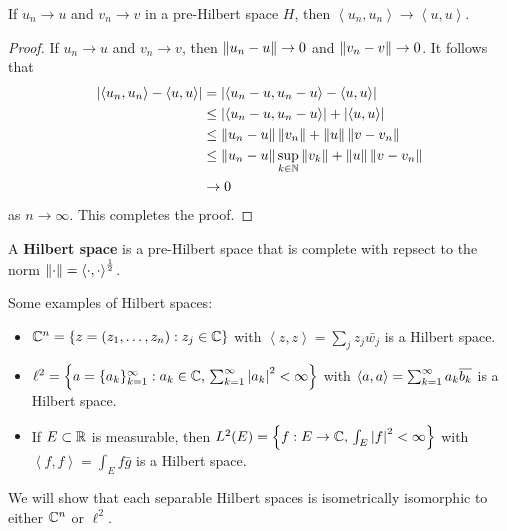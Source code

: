 \documentclass[a4paper]{article}
\renewcommand{\braket}[2]{\left\langle #1, #1 \right\rangle}
\begin{document}
\begin{thm}
  If $u_n \to u$ and $v_n \to v$ in a pre-Hilbert space $H$,
  then $\braket{u_n}{v_n} \to \braket{u}{v}$.
\end{thm}

\begin{proof}
  If $u_n \to u$ and $v_n \to v$, then
  $\left\lVert u_n - u\right\rVert \to 0$ and $\left\lVert v_n - v\right\rVert \to 0$.
  It follows that
  \[
    \begin{aligned}
      \abs{\braket{u_n}{v_n} - \braket{u}{v}}
       & = \abs{\braket{u_n - u}{v_n} - \braket{u}{v - v_n}}       \\
       & \leq \abs{\braket{u_n - u}{v_n}}
      + \abs{\braket{u}{v - v_n}}                                  \\
       & \leq \norm{u_n - u} \norm{v_n} + \norm{u} \norm{v - v_n}  \\
       & \leq \norm{u_n - u} \sup_{k \in \N} \norm{v_k} + \norm{u}
      \norm{v - v_n}                                               \\
       & \to 0
    \end{aligned}
  \]
  as $n \to \infty$. This completes the proof.
\end{proof}

\begin{defi}
  A \textbf{Hilbert space} is a pre-Hilbert space that is
  complete with repsect to the norm
  $\norm{\cdot} = \braket{\cdot}{\cdot}^{\frac{1}{2}}$.
\end{defi}

\begin{eg}
  Some examples of Hilbert spaces:
  \begin{itemize}
    \item $\mathbb{C}^n = \left\{ z = (z_1, \dots, z_n) : z_j \in \mathbb{C} \right\}$
          with
          $\braket{z}{w} = \sum_j z_j \bar{w_j}$ is a Hilbert
          space.

    \item $\ell^2 = \left\{ a = \{ a_k \}_{k=1}^\infty :
            \text{$a_k \in \mathbb{C}$, $\sum_{k=1}^\infty \left\lvert a_k\right\rvert^2 < \infty$} \right\}$
          with
          $\braket{a}{b} = \suminfk a_k \bar{b_k}$
          is a Hilbert space.

    \item If $E \subset \mathbb{R}$ is measurable, then
          $L^2(E) = \left\{ f: \text{$E \to \mathbb{C}$,
          $\int_E \left\lvert f\right\rvert^2 < \infty$} \right\}$ with
          $\braket{f}{g} = \int_E f \bar{g}$ is a Hilbert
          space.
  \end{itemize}
  We will show that each separable Hilbert spaces is
  isometrically isomorphic to either $\mathbb{C}^n$ or $\ell^2$.
\end{eg}
\end{document}
